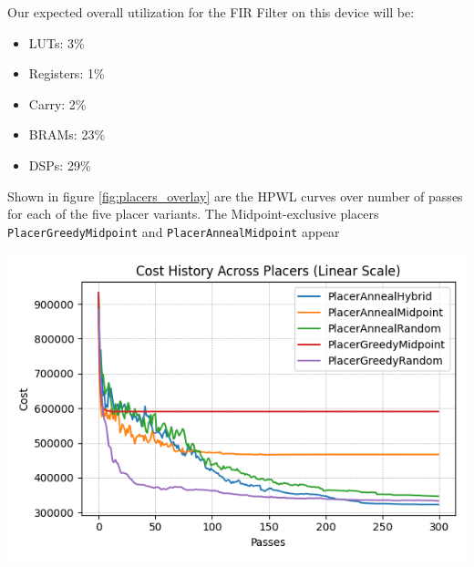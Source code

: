 Our expected overall utilization for the FIR Filter on this device will be:
\begin{itemize}
    \item LUTs: 3\%
    \item Registers: 1\%
    \item Carry: 2\%
    \item BRAMs: 23\%
    \item DSPs: 29\%
\end{itemize}

Shown in figure \ref{fig:placers_overlay} are the HPWL curves over number of passes for each of the five placer variants. 
The Midpoint-exclusive placers \texttt{PlacerGreedyMidpoint} and \texttt{PlacerAnnealMidpoint} appear 

{
    \centering
    \includegraphics[width=\columnwidth]{figures/results/combined_cost_history_linear.png}
    \label{fig:placers_overlay}
}


